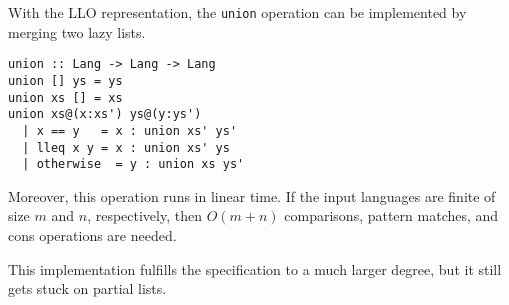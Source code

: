 With the LLO representation, the \texttt{union} operation can be
implemented by merging two lazy lists.
\begin{verbatim}
union :: Lang -> Lang -> Lang
union [] ys = ys
union xs [] = xs
union xs@(x:xs') ys@(y:ys')
  | x == y   = x : union xs' ys'
  | lleq x y = x : union xs' ys
  | otherwise  = y : union xs ys'
\end{verbatim}
Moreover, this operation runs in linear time. If the input languages
are finite of size $m$ and $n$, respectively, then $O(m+n)$
comparisons, pattern matches, and cons operations are needed.

This implementation fulfills the specification to a much larger
degree, but it still gets stuck on partial lists.

